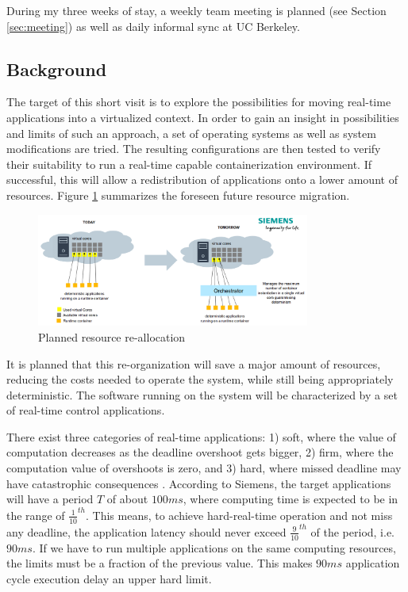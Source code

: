 \documentclass[]{scrartcl}
\begin{document}
During my three weeks of stay, a weekly team meeting is planned (see Section \ref{sec:meeting}) as well as daily informal sync at UC Berkeley.

\subsection{Background}

The target of this short visit is to explore the possibilities for moving real-time applications into a virtualized context. In order to gain an insight in possibilities and limits of such an approach, a set of operating systems as well as system modifications are tried.
The resulting configurations are then tested to verify their suitability to run a real-time capable containerization environment. If successful, this will allow a redistribution of applications onto a lower amount of resources. 
Figure \ref{fig:plan} summarizes the foreseen future resource migration. %

\begin{figure}
	\centering
	\includegraphics[width=0.8\textwidth]{plan}
	\caption{Planned resource re-allocation}
	\label{fig:plan}
\end{figure}

It is planned that this re-organization will save a major amount of resources, reducing the costs needed to operate the system, while still being appropriately deterministic.
The software running on the system will be characterized by a set of real-time control applications. 

There exist three categories of real-time applications:
1) soft, where the value of computation decreases as the deadline overshoot gets bigger, 
2) firm, where the computation value of overshoots is zero, and 
3) hard, where missed deadline may have catastrophic consequences \cite{Buttazzo2011}.
According to Siemens, the target applications will have a period $T$ of about $100 ms$, where computing time is expected to be in the range of $\frac{1}{10}^{th}$. This means, to achieve hard-real-time operation and not miss any deadline, the application latency should never exceed $\frac{9}{10}^{th}$ of the period, i.e. $90 ms$. If we have to run multiple applications on the same computing resources, the limits must be a fraction of the previous value. This makes $90 ms$ application cycle execution delay an upper hard limit.
\end{document}
